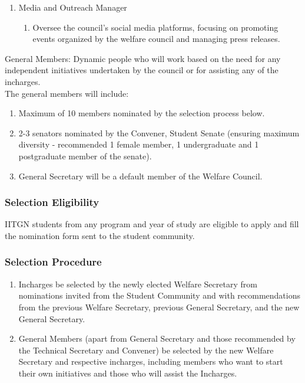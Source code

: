 \documentclass[12pt]{article}
\begin{document}
\begin{enumerate}
    \begin{enumerate}
        \item responsible for creating engaging and informative content that reflects the activities and initiatives of the Welfare Council.
        \item Writing detailed reports on council activities, and preparing materials for both internal and external communications.
    \end{enumerate}
    \item Media and Outreach Manager
    \begin{enumerate}
        \item Oversee the council's social media platforms, focusing on promoting events organized by the welfare council and managing press releases.
    \end{enumerate}
\end{enumerate}

\noindent General Members: Dynamic people who will work based on the need for any independent initiatives undertaken by the council or for assisting any of the incharges.\\

\noindent The general members will include:
\begin{enumerate}
    \item Maximum of 10 members nominated by the selection process below.
    \item 2-3 senators nominated by the Convener, Student Senate (ensuring maximum diversity - recommended 1 female member, 1 undergraduate and 1 postgraduate member of the senate).
    \item General Secretary will be a default member of the Welfare Council.
\end{enumerate}

\subsubsection{Selection Eligibility}
IITGN students from any program and year of study are eligible to apply and fill the nomination form sent to the student community.

\subsubsection{Selection Procedure}
\begin{enumerate}
    \item Incharges be selected by the newly elected Welfare Secretary from nominations invited from the Student Community and with recommendations from the previous Welfare Secretary, previous General Secretary, and the new General Secretary.
    \item General Members (apart from General Secretary and those recommended by the Technical Secretary and Convener) be selected by the new Welfare Secretary and respective incharges, including members who want to start their own initiatives and those who will assist the Incharges.
\end{enumerate}
\end{document}
